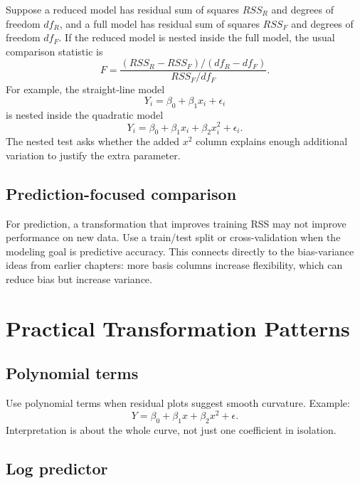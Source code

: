 Suppose a reduced model has residual sum of squares \(RSS_R\) and degrees of freedom \(df_R\), and a full model has residual sum of squares \(RSS_F\) and degrees of freedom \(df_F\).  If the reduced model is nested inside the full model, the usual comparison statistic is
\begin{equation}
  F=\frac{(RSS_R-RSS_F)/(df_R-df_F)}{RSS_F/df_F}.
\end{equation}
For example, the straight-line model
\begin{equation}
  Y_i=\beta_0+\beta_1x_i+\epsilon_i
\end{equation}
is nested inside the quadratic model
\begin{equation}
  Y_i=\beta_0+\beta_1x_i+\beta_2x_i^2+\epsilon_i.
\end{equation}
The nested test asks whether the added \(x^2\) column explains enough additional variation to justify the extra parameter.

\subsection*{Prediction-focused comparison}

For prediction, a transformation that improves training RSS may not improve performance on new data.  Use a train/test split or cross-validation when the modeling goal is predictive accuracy.  This connects directly to the bias-variance ideas from earlier chapters: more basis columns increase flexibility, which can reduce bias but increase variance.

\section{Practical Transformation Patterns}

\subsection*{Polynomial terms}

Use polynomial terms when residual plots suggest smooth curvature.  Example:
\begin{equation}
  Y=\beta_0+\beta_1x+\beta_2x^2+\epsilon.
\end{equation}
Interpretation is about the whole curve, not just one coefficient in isolation.

\subsection*{Log predictor}

